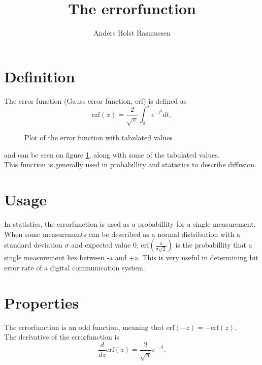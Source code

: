 \documentclass[a4paper, 12pt]{article}
\title{The errorfunction}
\author{Anders Holst Rasmussen}
\begin{document}
\maketitle
\section{Definition}
The error function (Gauss error function, erf) is defined as 
\begin{equation}
	\text{erf}(x) = \frac{2}{\sqrt{\pi}} \int^x_{0} e^{-t^2} dt,
\end{equation}

\begin{figure}
	\centering
	
	\caption{Plot of the error function with tabulated values}
	\label{fig:erf}
\end{figure}
and can be seen on figure \ref{fig:erf}, along with some of the tabulated values. \\
This function is generally used in probabillity and statistics to describe diffusion. 

\section{Usage}
In statistics, the errorfunction is used as a probabillity for a single measurement. When some measurements can be described as a normal distribution with a standard deviation $\sigma$ and expected value 0, $\text{erf}\left(\frac{a}{\sigma\sqrt{2}} \right)$ is the probabillity that a single measurement lies between -a and +a. This is very useful in determining bit error rate of a digital communication system. 

\section{Properties}
The errorfunction is an odd function, meaning that $\text{erf}(-z) = -\text{erf}(z)$.\\
The derivative of the errorfunction is
\begin{equation}
	\frac{d}{dz}\text{erf}(z) = \frac{2}{\sqrt{\pi}} e^{-z^2}.
\end{equation}
\end{document}
